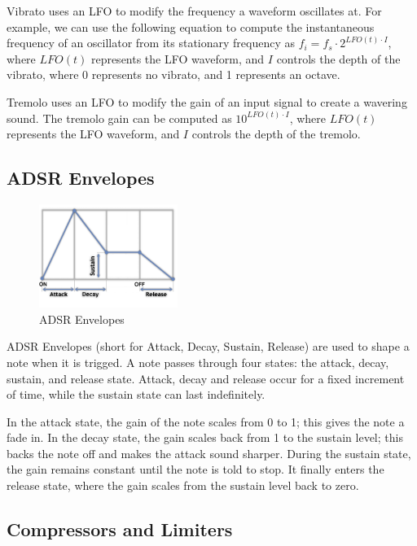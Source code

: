 \documentclass[letterpaper,12pt]{article}
\begin{document}
Vibrato uses an LFO to modify the frequency a waveform oscillates at. For example, we can use the following equation to compute the instantaneous frequency of an oscillator from its stationary frequency as $f_i = f_s \cdot 2^{LFO(t) \cdot I}$, where $LFO(t)$ represents the LFO waveform, and $I$ controls the depth of the vibrato, where 0 represents no vibrato, and 1 represents an octave.

Tremolo uses an LFO to modify the gain of an input signal to create a wavering sound. The tremolo gain can be computed as $10^{LFO(t) \cdot I}$, where $LFO(t)$ represents the LFO waveform, and $I$ controls the depth of the tremolo.


\subsection{ADSR Envelopes}

\begin{figure}
\centering
\includegraphics[width=0.4\textwidth]{figures/adsr.png}
\caption{ADSR Envelopes}
\label{fig:adsr}
\end{figure}

ADSR Envelopes (short for Attack, Decay, Sustain, Release) are used to shape a note when it is trigged. A note passes through four states: the attack, decay, sustain, and release state. Attack, decay and release occur for a fixed increment of time, while the sustain state can last indefinitely.

In the attack state, the gain of the note scales from 0 to 1; this gives the note a fade in. In the decay state, the gain scales back from 1 to the sustain level; this backs the note off and makes the attack sound sharper. During the sustain state, the gain remains constant until the note is told to stop. It finally enters the release state, where the gain scales from the sustain level back to zero.


\subsection{Compressors and Limiters}
\end{document}

